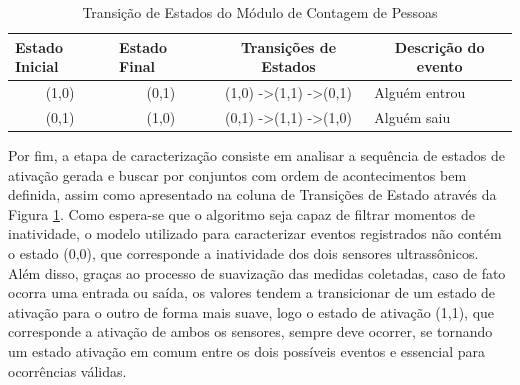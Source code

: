 \begin{table}[H]
	\centering
	\caption{Transição de Estados do Módulo de Contagem de Pessoas}\label{tab:state_machine}
	\begin{tabular}{|c|c|c|l|}
		\hline
		\multicolumn{1}{|l|}{\textbf{Estado Inicial}} & \multicolumn{1}{l|}{\textbf{Estado Final}} & \textbf{Transições de Estados}                & \multicolumn{1}{c|}{\textbf{Descrição do evento}} \\ \hline
		(1,0)                                         & (0,1)                                      & (1,0) -\textgreater (1,1) -\textgreater (0,1) & Alguém entrou                                     \\ \hline
		(0,1)                                         & (1,0)                                      & (0,1) -\textgreater (1,1) -\textgreater (1,0) & Alguém saiu                                       \\ \hline
	\end{tabular}
\end{table}

Por fim, a etapa de caracterização consiste em analisar a sequência de estados de ativação gerada e buscar por conjuntos com ordem de acontecimentos bem definida, assim como apresentado na coluna de Transições de Estado através da Figura \ref{tab:state_machine}. Como espera-se que o algoritmo seja capaz de filtrar momentos de inatividade, o modelo utilizado para caracterizar eventos registrados não contém o estado (0,0), que corresponde a inatividade dos dois sensores ultrassônicos. Além disso, graças ao processo de suavização das medidas coletadas, caso de fato ocorra uma entrada ou saída, os valores tendem a transicionar de um estado de ativação para o outro de forma mais suave, logo o estado de ativação (1,1), que corresponde a ativação de ambos os sensores, sempre deve ocorrer, se tornando um estado ativação em comum entre os dois possíveis eventos e essencial para ocorrências válidas.


